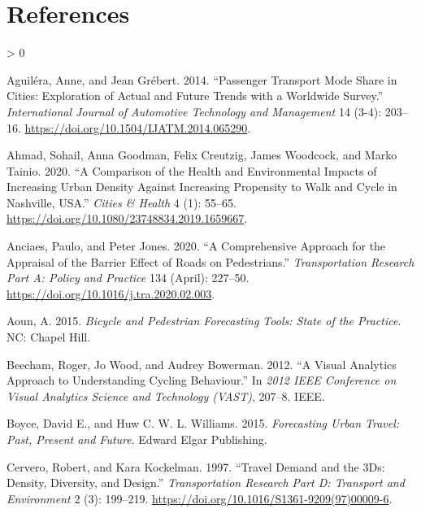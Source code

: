 \documentclass[galley]{jtlu-article-2col}
\newlength{\cslhangindent}
\newenvironment{CSLReferences}[2] %
 {%
  \setlength{\parindent}{0pt}
  \ifodd #1 \everypar{\setlength{\hangindent}{\cslhangindent}}\ignorespaces\fi
  \ifnum #2 > 0
  \setlength{\parskip}{#2\baselineskip}
  \fi
 }%
 {}
\begin{document}
\hypertarget{references}{%
\section*{References}\label{references}}

\hypertarget{refs}{}
\begin{CSLReferences}{1}{0}
\leavevmode\hypertarget{ref-aguilera_passenger_2014}{}%
Aguiléra, Anne, and Jean Grébert. 2014. {``Passenger Transport Mode Share in Cities: Exploration of Actual and Future Trends with a Worldwide Survey.''} \emph{International Journal of Automotive Technology and Management} 14 (3-4): 203--16. \url{https://doi.org/10.1504/IJATM.2014.065290}.

\leavevmode\hypertarget{ref-ahmad_comparison_2020}{}%
Ahmad, Sohail, Anna Goodman, Felix Creutzig, James Woodcock, and Marko Tainio. 2020. {``A Comparison of the Health and Environmental Impacts of Increasing Urban Density Against Increasing Propensity to Walk and Cycle in {Nashville}, {USA}.''} \emph{Cities \& Health} 4 (1): 55--65. \url{https://doi.org/10.1080/23748834.2019.1659667}.

\leavevmode\hypertarget{ref-anciaes_comprehensive_2020}{}%
Anciaes, Paulo, and Peter Jones. 2020. {``A Comprehensive Approach for the Appraisal of the Barrier Effect of Roads on Pedestrians.''} \emph{Transportation Research Part A: Policy and Practice} 134 (April): 227--50. \url{https://doi.org/10.1016/j.tra.2020.02.003}.

\leavevmode\hypertarget{ref-aoun_bicycle_2015}{}%
Aoun, A. 2015. \emph{Bicycle and Pedestrian Forecasting Tools: {State} of the Practice}. {NC}: {Chapel Hill}.

\leavevmode\hypertarget{ref-beecham_visual_2012}{}%
Beecham, Roger, Jo Wood, and Audrey Bowerman. 2012. {``A Visual Analytics Approach to Understanding Cycling Behaviour.''} In \emph{2012 {IEEE Conference} on {Visual Analytics Science} and {Technology} ({VAST})}, 207--8. {IEEE}.

\leavevmode\hypertarget{ref-boyce_forecasting_2015}{}%
Boyce, David E., and Huw C. W. L. Williams. 2015. \emph{Forecasting {Urban Travel}: {Past}, {Present} and {Future}}. {Edward Elgar Publishing}.

\leavevmode\hypertarget{ref-cervero_travel_1997}{}%
Cervero, Robert, and Kara Kockelman. 1997. {``Travel Demand and the {3Ds}: {Density}, Diversity, and Design.''} \emph{Transportation Research Part D: Transport and Environment} 2 (3): 199--219. \url{https://doi.org/10.1016/S1361-9209(97)00009-6}.


\end{CSLReferences}
\end{document}
